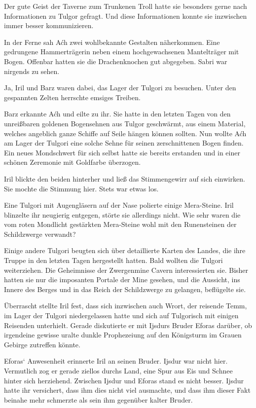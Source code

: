Der gute Geist der Taverne zum Trunkenen Troll hatte sie besonders gerne nach Informationen zu Tulgor gefragt. Und diese Informationen konnte sie inzwischen immer besser kommunizieren.

In der Ferne sah Aćh zwei wohlbekannte Gestalten näherkommen. Eine gedrungene Hammerträgerin neben einem hochgewachsenen Mantelträger mit Bogen. Offenbar hatten sie die Drachenknochen gut abgegeben. Sabri war nirgends zu sehen.

Ja, Iril und Barz waren dabei, das Lager der Tulgori zu besuchen. Unter den gespannten Zelten herrschte emsiges Treiben.

Barz erkannte Aćh und eilte zu ihr. Sie hatte in den letzten Tagen von den unreißbaren goldenen Bogensehnen aus Tulgor geschwärmt, aus einem Material, welches angeblich ganze Schiffe auf Seile hängen können sollten. Nun wollte Aćh am Lager der Tulgori eine solche Sehne für seinen zerschnittenen Bogen finden. Ein neues Mondschwert für sich selbst hatte sie bereits erstanden und in einer schönen Zeremonie mit Goldfarbe überzogen.

Iril blickte den beiden hinterher und ließ das Stimmengewirr auf sich einwirken. Sie mochte die Stimmung hier. Stets war etwas los.

Eine Tulgori mit Augengläsern auf der Nase polierte einige Mera-Steine. Iril blinzelte ihr neugierig entgegen, störte sie allerdings nicht. Wie sehr waren die vom roten Mondlicht gestärkten Mera-Steine wohl mit den Runensteinen der Schildzwerge verwandt?

Einige andere Tulgori beugten sich über detaillierte Karten des Landes, die ihre Truppe in den letzten Tagen hergestellt hatten. Bald wollten die Tulgori weiterziehen. Die Geheimnisse der Zwergenmine Cavern interessierten sie. Bisher hatten sie nur die imposanten Portale der Mine gesehen, und die Aussicht, ins Innere des Berges und in das Reich der Schildzwerge zu gelangen, beflügelte sie.

Überrascht stellte Iril fest, dass sich inzwischen auch Wrort, der reisende Temm, im Lager der Tulgori niedergelassen hatte und sich auf Tulgorisch mit einigen Reisenden unterhielt. Gerade diskutierte er mit Ijsdurs Bruder Eforas darüber, ob irgendeine gewisse uralte dunkle Prophezeiung auf den Königsturm im Grauen Gebirge zutreffen könnte.

Eforas‘ Anwesenheit erinnerte Iril an seinen Bruder. Ijsdur war nicht hier. Vermutlich zog er gerade ziellos durchs Land, eine Spur aus Eis und Schnee hinter sich herziehend. Zwischen Ijsdur und Eforas stand es nicht besser. Ijsdur hatte ihr versichert, dass ihm dies nicht viel ausmachte, und dass ihm dieser Fakt beinahe mehr schmerzte als sein ihm gegenüber kalter Bruder.

